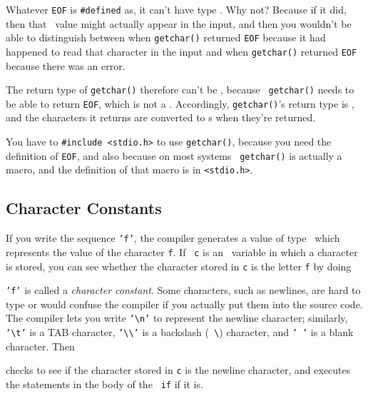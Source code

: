 Whatever {\tt EOF} is {\tt\#defined} as, it can't have type \chr.  Why
not?  Because if it did, then that \chr\ value might actually appear in
the input, and then you wouldn't be able to distinguish between when
{\tt getchar()} returned {\tt EOF} because it had happened to read that
character in the input and when {\tt getchar()} returned {\tt EOF}
because there was an error.  

The return type of {\tt getchar()} therefore can't be \chr, because {\tt
getchar()} needs to be able to return {\tt EOF}, which is not a \chr.
Accordingly, {\tt getchar()}'s return type is \int, and the characters
it returns are converted to \int s when they're returned.

You have to {\tt\#include <stdio.h>} to use {\tt getchar()}, because you
need the definition of {\tt EOF}, and also because on most systems {\tt
getchar()} is actually a macro, and the definition of that macro is in
{\tt <stdio.h>}.

\subsection{Character Constants}

If you write the sequence {\tt 'f'}, the compiler generates a value of
type \int\ which represents the value of the character {\tt f}.  If {\tt
c} is an \int\ variable in which a character is stored, you can see
whether the character stored in {\tt c} is the letter {\tt f} by doing

\begin{flushleft}
\verb% if (c == 'f') { ... } % 
\end{flushleft}

{\tt 'f'} is called a {\em character constant}\/.  Some characters, such
as newlines, are hard to type or would confuse the compiler if you
actually put them into the source code.  The compiler lets you write
{\tt '\verb+\+n'} to represent the newline character; similarly, {\tt
'\verb+\+t'} is a TAB character, {\tt '\verb+\\+'} is a backslash ({\tt
\verb+\+}) character, and {\tt ' '} is a blank character.  Then

\begin{flushleft}
\verb% if (c == '\n') { ... } % 
\end{flushleft}

\noindent checks to see if the character stored in {\tt c} is the
newline character, and executes the statements in the body of the {\tt
if} if it is.

